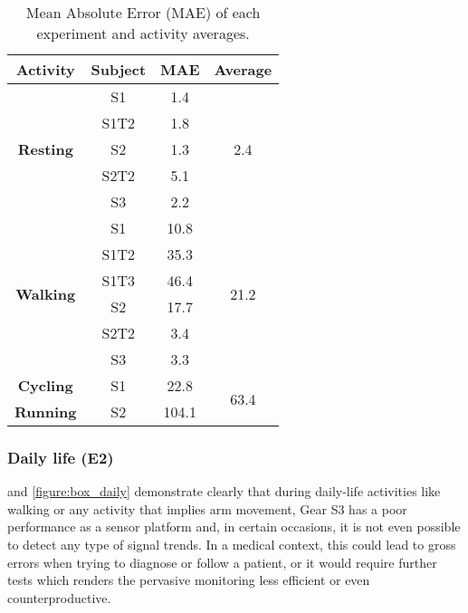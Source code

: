 \begin{table}[!h]
	\centering
	\caption{Mean Absolute Error (MAE) of each experiment and activity averages.}
	\label{table:MAE}
	\begin{tabular}{|c|c|c|c|}
		\hline
		\textbf{Activity}                 & \textbf{Subject} & \textbf{MAE} & \textbf{Average}      \\ \hline
		\multirow{5}{*}{\textbf{Resting}} & S1               & 1.4          & \multirow{5}{*}{2.4}  \\ \cline{2-3}
		& S1T2             & 1.8          &                       \\ \cline{2-3}
		& S2               & 1.3          &                       \\ \cline{2-3}
		& S2T2             & 5.1          &                       \\ \cline{2-3}
		& S3               & 2.2          &                       \\ \hline
		\multirow{6}{*}{\textbf{Walking}} & S1               & 10.8         & \multirow{6}{*}{21.2} \\ \cline{2-3}
		& S1T2             & 35.3         &                       \\ \cline{2-3}
		& S1T3             & 46.4         &                       \\ \cline{2-3}
		& S2               & 17.7         &                       \\ \cline{2-3}
		& S2T2             & 3.4          &                       \\ \cline{2-3}
		& S3               & 3.3          &                       \\ \hline
		\textbf{Cycling}                  & S1               & 22.8         & \multirow{2}{*}{63.4} \\ \cline{1-3}
		\textbf{Running}                  & S2               & 104.1        &                       \\ \hline
	\end{tabular}
\end{table}

\FloatBarrier
\subsubsection{Daily life (E2)}
\FloatBarrier

 and \cref{figure:box_daily} demonstrate clearly that during daily-life activities like walking or any activity that implies arm movement, Gear S3 has a poor performance as a sensor platform and, in certain occasions, it is not even possible to detect any type of signal trends. In a medical context, this could lead to gross errors when trying to diagnose or follow a patient, or it would require further tests which renders the pervasive monitoring less efficient or even counterproductive.

